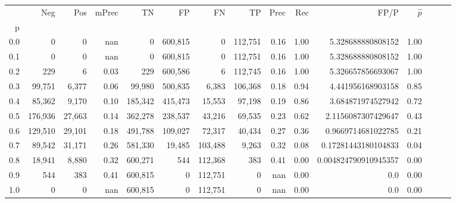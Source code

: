 \begin{tabular}{rrrrrrrrrrrrrrr}
\toprule
{} &      Neg &     Pos & mPrec &       TN &       FP &       FN &       TP &  Prec &   Rec &                  FP/P & $\hat{p}$ \\
p   &          &         &       &          &          &          &          &       &       &                       &           \\
\midrule
0.0 &        0 &       0 &   nan &        0 &  600,815 &        0 &  112,751 &  0.16 &  1.00 &     5.328688880808152 &      1.00 \\
0.1 &        0 &       0 &   nan &        0 &  600,815 &        0 &  112,751 &  0.16 &  1.00 &     5.328688880808152 &      1.00 \\
0.2 &      229 &       6 &  0.03 &      229 &  600,586 &        6 &  112,745 &  0.16 &  1.00 &     5.326657856693067 &      1.00 \\
0.3 &   99,751 &   6,377 &  0.06 &   99,980 &  500,835 &    6,383 &  106,368 &  0.18 &  0.94 &     4.441956168903158 &      0.85 \\
0.4 &   85,362 &   9,170 &  0.10 &  185,342 &  415,473 &   15,553 &   97,198 &  0.19 &  0.86 &     3.684871974527942 &      0.72 \\
0.5 &  176,936 &  27,663 &  0.14 &  362,278 &  238,537 &   43,216 &   69,535 &  0.23 &  0.62 &    2.1156087307429647 &      0.43 \\
0.6 &  129,510 &  29,101 &  0.18 &  491,788 &  109,027 &   72,317 &   40,434 &  0.27 &  0.36 &    0.9669714681022785 &      0.21 \\
0.7 &   89,542 &  31,171 &  0.26 &  581,330 &   19,485 &  103,488 &    9,263 &  0.32 &  0.08 &   0.17281443180104833 &      0.04 \\
0.8 &   18,941 &   8,880 &  0.32 &  600,271 &      544 &  112,368 &      383 &  0.41 &  0.00 &  0.004824790910945357 &      0.00 \\
0.9 &      544 &     383 &  0.41 &  600,815 &        0 &  112,751 &        0 &   nan &  0.00 &                   0.0 &      0.00 \\
1.0 &        0 &       0 &   nan &  600,815 &        0 &  112,751 &        0 &   nan &  0.00 &                   0.0 &      0.00 \\
\bottomrule
\end{tabular}
